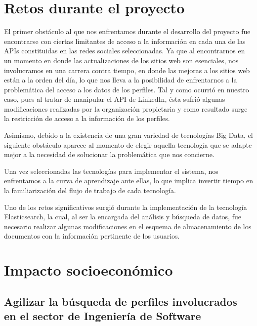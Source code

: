
\section{Retos durante el proyecto}
\label{sec:sec04}

El primer obstáculo al que nos enfrentamos durante el desarrollo del proyecto fue encontrarse con ciertas limitantes de acceso a la información en cada una de las APIs constituidas en las redes sociales seleccionadas. Ya que al encontrarnos en un momento en donde las actualizaciones de los sitios web son esenciales, nos involucramos en una carrera contra tiempo, en donde las mejoras a los sitios web están a la orden del día, lo que nos lleva a la posibilidad de enfrentarnos a la problemática del acceso a los datos de los perfiles. Tal y como ocurrió en nuestro caso, pues al tratar de manipular el API de LinkedIn, ésta sufrió algunas modificaciones realizadas por la organización propietaria y como resultado surge la restricción de acceso a la información de los perfiles.

Asimismo, debido a la existencia de una gran variedad de tecnologías Big Data, el siguiente obstáculo aparece al momento de elegir aquella tecnología que se adapte mejor a la necesidad de solucionar la problemática que nos concierne. 

Una vez seleccionadas las tecnologías para implementar el sistema, nos enfrentamos a la curva de aprendizaje ante ellas, lo que implica invertir tiempo en la familiarización del flujo de trabajo de cada tecnología. 

Uno de los retos significativos surgió durante la implementación de la tecnología Elasticsearch, la cual, al ser la encargada del análisis y búsqueda de datos, fue necesario realizar algunas modificaciones en el esquema de almacenamiento de los documentos con la información pertinente de los usuarios.



\section{Impacto socioecon\'omico}
\label{sec:sec05}

\subsection{Agilizar la búsqueda de perfiles involucrados en el sector de Ingeniería de Software}
\label{subsec:subsec05}

